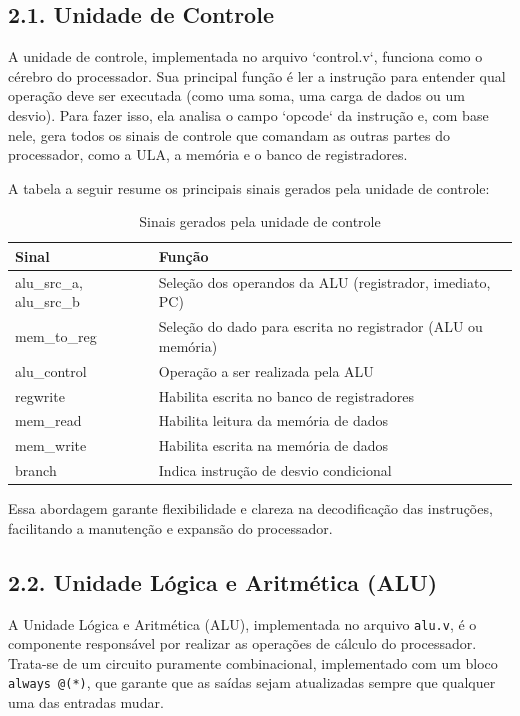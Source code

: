 \documentclass[12pt, a4paper]{article}
\begin{document}
\subsection*{2.1. Unidade de Controle}

A unidade de controle, implementada no arquivo `control.v`, funciona como o cérebro do processador. Sua principal função é ler a instrução para entender qual operação deve ser executada (como uma soma, uma carga de dados ou um desvio). Para fazer isso, ela analisa o campo `opcode` da instrução e, com base nele, gera todos os sinais de controle que comandam as outras partes do processador, como a ULA, a memória e o banco de registradores.

A tabela a seguir resume os principais sinais gerados pela unidade de controle:

\begin{table}[h!]
\centering
\caption{Sinais gerados pela unidade de controle}
\label{tab:controle_outputs}
\begin{tabular}{|l|p{8cm}|}
\hline
\textbf{Sinal} & \textbf{Função} \\ 
\hline
alu\_src\_a, alu\_src\_b & Seleção dos operandos da ALU (registrador, imediato, PC) \\
mem\_to\_reg & Seleção do dado para escrita no registrador (ALU ou memória) \\
alu\_control & Operação a ser realizada pela ALU \\
regwrite & Habilita escrita no banco de registradores \\
mem\_read & Habilita leitura da memória de dados \\
mem\_write & Habilita escrita na memória de dados \\
branch & Indica instrução de desvio condicional \\
\hline
\end{tabular}
\end{table}

Essa abordagem garante flexibilidade e clareza na decodificação das instruções, facilitando a manutenção e expansão do processador.

\subsection*{2.2. Unidade Lógica e Aritmética (ALU)}

A Unidade Lógica e Aritmética (ALU), implementada no arquivo \texttt{alu.v}, é o componente responsável por realizar as operações de cálculo do processador. Trata-se de um circuito puramente combinacional, implementado com um bloco \texttt{always @(*)}, que garante que as saídas sejam atualizadas sempre que qualquer uma das entradas mudar.
\end{document}
